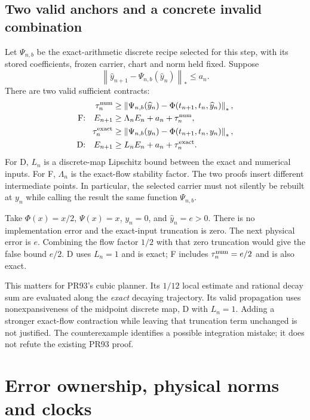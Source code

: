 \documentclass[aps,pra,reprint,onecolumn,10pt,notitlepage,nofootinbib]{revtex4-2}
\newcommand{\norm}[1]{\left\|#1\right\|}
\begin{document}
\subsection{Two valid anchors and a concrete invalid combination}

Let $\Psi_{n,b}$ be the exact-arithmetic discrete recipe selected for this
step, with its stored coefficients, frozen carrier, chart and norm held fixed.
Suppose
\begin{equation}
 \norm{\widehat y_{n+1}-\Psi_{n,b}(\widehat y_n)}_*
 \le a_n.                                                   \label{eq:algebraicleaf}
\end{equation}
There are two valid sufficient contracts:
\begin{align}
 \tau_n^{\rm num}&\ge\norm{\Psi_{n,b}(\widehat y_n)
                   -\Phi(t_{n+1},t_n,\widehat y_n)}_*,\nonumber\\
 \text{F:}\quad E_{n+1}&\ge\Lambda_nE_n+a_n+\tau_n^{\rm num},\label{eq:F}\\
 \tau_n^{\rm exact}&\ge\norm{\Psi_{n,b}(y_n)
                    -\Phi(t_{n+1},t_n,y_n)}_* ,\nonumber\\
 \text{D:}\quad E_{n+1}&\ge L_nE_n+a_n+\tau_n^{\rm exact}.    \label{eq:D}
\end{align}
For D, $L_n$ is a discrete-map Lipschitz bound between the exact and numerical
inputs. For F, $\Lambda_n$ is the exact-flow stability factor. The two proofs
insert different intermediate points. In particular, the selected carrier
must not silently be rebuilt at $y_n$ while calling the result the same
function $\Psi_{n,b}$.

Take $\Phi(x)=x/2$, $\Psi(x)=x$, $y_n=0$, and $\widehat y_n=e>0$.
There is no implementation error and the exact-input truncation is zero.
The next physical error is $e$. Combining the flow factor $1/2$ with that
zero truncation would give the false bound $e/2$. D uses $L_n=1$ and is exact;
F includes $\tau_n^{\rm num}=e/2$ and is also exact.

This matters for PR93's cubic planner. Its $1/12$ local estimate and rational
decay sum are evaluated along the \emph{exact} decaying trajectory. Its valid
propagation uses nonexpansiveness of the midpoint discrete map, D with $L_n=1$.
Adding a stronger exact-flow contraction while leaving that truncation term
unchanged is not justified. The counterexample identifies a possible
integration mistake; it does not refute the existing PR93 proof.

\section{Error ownership, physical norms and clocks}
\end{document}
